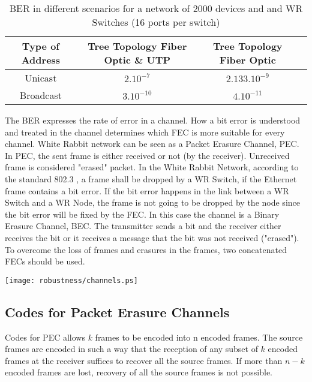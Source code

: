 \begin{table}[!ht]
        \begin{center}
                \begin{tabular}{|c|c|c|c|}
		\hline
			 Type of Address & Tree Topology Fiber Optic \& UTP &  Tree Topology Fiber Optic \\ \hline
			 Unicast & $2.10^{-7}$   &  $ 2.133.10^{-9}$ \\ \hline 
			 Broadcast& $3.10^{-10} $ & $4.10^{-11}$ \\ \hline
		\end{tabular}
          \caption{BER in different scenarios for a network of 2000 devices and and WR Switches (16 ports per switch)}
	  \label{tab:BER_WR}
	\end{center}
\end{table}

The BER expresses the rate of error in a channel. How a bit error is
understood and treated in the channel determines which FEC is more suitable for
every channel. White Rabbit network can be seen as a Packet Erasure Channel,
PEC. In PEC, the sent frame is either received or not (by the receiver).
Unreceived frame is considered "erased" packet. In the White Rabbit
Network, according to the standard 802.3 \cite{IEEE8023}, a frame shall be
dropped by a WR Switch, if the Ethernet frame contains a bit error. If the bit
error happens in the link between a WR Switch and a WR Node, the frame is not
going to be dropped by the node since the bit error will be fixed by the FEC. In
this case the channel is a Binary Erasure Channel, BEC. The transmitter sends a
bit and the receiver either receives the bit or it receives a message that the
bit was not received ("erased"). To overcome the loss of frames and erasures in
the frames, two concatenated FECs should be used.

\begin{center}
	\texttt{[image: robustness/channels.ps]}
	\label{fig:wr_channels}
\end{center}

\subsection{Codes for Packet Erasure Channels}

Codes for PEC allows $k$ frames to be encoded into n encoded frames. The source
frames are encoded in such a way that the reception of any subset of $k$ encoded
frames at the receiver suffices to recover all the source frames. If more
than $n-k$ encoded frames are lost, recovery of all the source frames is not
possible.

